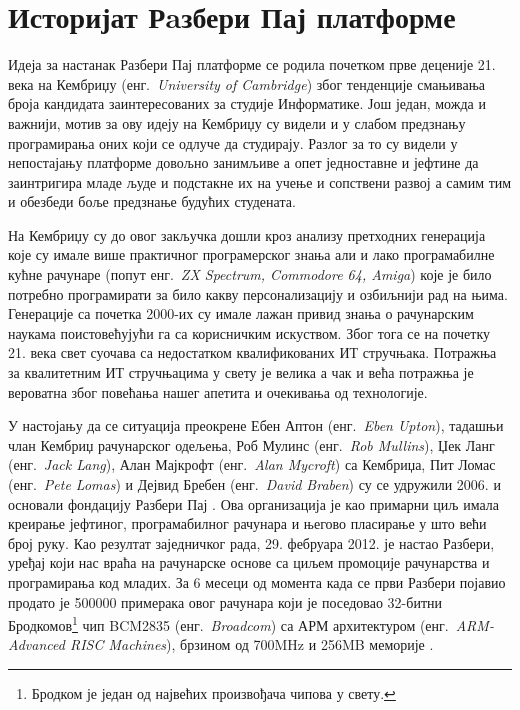 \documentclass[12pt,oneside]{memoir}
\theoremstyle{remark}
\begin{document}
\section{Историјат Рaзбери Пај платформе }
Идеја за настанак Разбери Пај платформе се родила почетком прве деценије 21. века на Кембриџу (енг.~{\em University of Cambridge}) због тенденције смањивања броја кандидата заинтересованих за студије Информатике. Још један, можда и важнији, мотив за ову идеју на Кембриџу су видели и у слабом предзнању програмирања оних који се одлуче да студирају. Разлог за то су видели у непостајању платформе довољно занимљиве а опет једноставне и јефтине да заинтригира младе људе и подстакне их на учење и сопствени развој а самим тим и обезбеди боље предзнање будућих студената.

На Кембриџу су до овог закључка дошли кроз анализу претходних генерација које су имале више практичног програмерског знања али и лако програмабилне кућне рачунаре (попут енг.~{\em ZX Spectrum, Commodore 64, Amiga}) које је било потребно програмирати за било какву персонализацију и озбиљнији рад на њима. Генерације са почетка 2000-их су имале лажан привид знања о рачунарским наукама поистовећујући га са корисничким искуством. Због тога се на почетку 21. века свет суочава са недостатком квалификованих ИТ стручњака. Потражња за квалитетним ИТ стручњацима у свету је велика а чак и већа потражња је  вероватна због повећања нашег апетита и очекивања од технологије.

У настојању да се ситуација преокрене Ебен Аптон (енг.~{\em Eben Upton}), тадашњи члан Кембриџ рачунарског одељења, Роб Мулинс (енг.~{\em Rob Mullins}), Џек Ланг (енг.~{\em Jack Lang}), Алан Мајкрофт (енг.~{\em Alan Mycroft}) са Кембриџа, Пит Ломас (енг.~{\em Pete Lomas}) и Дејвид Бребен (енг.~{\em David Braben}) су се удружили 2006. и основали фондацију Разбери Пај \cite{rpibook}. Ова организација је као примарни циљ имала креирање јефтиног, програмабилног рачунара и његово пласирање у што већи број руку. Као резултат заједничког рада, 29. фебруара 2012. је настао Разбери, уређај који нас враћа на рачунарске основе са циљем промоције рачунарства и програмирања код младих. За 6 месеци од момента када се први Разбери појавио продато је 500000 примерака овог рачунара који је поседовао 32-битни Бродкомов\footnote{Бродком је један од највећих произвођача чипова у свету.} чип BCM2835 (енг.~{\em Broadcom}) са АРМ архитектуром (енг.~{\em ARM-Advanced RISC Machines}), брзином од 700MHz и 256MB меморије \cite{rpibook}.
\end{document}
